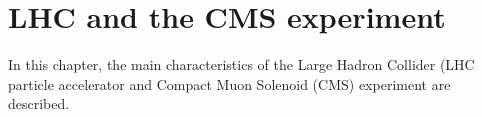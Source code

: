 \chapter{LHC and the CMS experiment}\label{chap2}
\thispagestyle{empty}
In this chapter, the main characteristics of the Large Hadron Collider (LHC particle accelerator and Compact Muon Solenoid (CMS) experiment are described.





